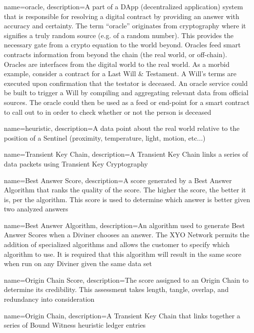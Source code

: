 \documentclass{article}
\begin{document}
{
    name={oracle},
    description={A part of a DApp (decentralized application) system that is responsible for resolving a digital contract by providing an answer with accuracy and certainty. The term ``oracle'' originates from cryptography where it signifies a truly random source (e.g. of a random number). This provides the necessary gate from a crypto equation to the world beyond. Oracles feed smart contracts information from beyond the chain (the real world, or off-chain). Oracles are interfaces from the digital world to the real world. As a morbid example, consider a contract for a Last Will \& Testament. A Will's terms are executed upon confirmation that the testator is deceased. An oracle service could be built to trigger a Will by compiling and aggregating relevant data from official sources. The oracle could then be used as a feed or end-point for a smart contract to call out to in order to check whether or not the person is deceased}
}

{
    name={heuristic},
    description={A data point about the real world relative to the position of a Sentinel (proximity, temperature, light, motion, etc...)}
}

{
    name={Transient Key Chain},
    description={A Transient Key Chain links a series of data packets using Transient Key Cryptography}
}

{
    name={Best Answer Score},
    description={A score generated by a Best Answer Algorithm that ranks the quality of the score.  The higher the score, the better it is, per the algorithm.  This score is used to determine which answer is better given two analyzed answers}
}

{
    name={Best Answer Algorithm},
    description={An algorithm used to generate Best Answer Scores when a Diviner chooses an answer.  The XYO Network permits the addition of specialized algorithms and allows the customer to specify which algorithm to use.  It is required that this algorithm will result in the same score when run on any Diviner given the same data set}
}

{
    name={Origin Chain Score},
    description={The score assigned to an Origin Chain to determine its credibility. This assessment takes length, tangle, overlap, and redundancy into consideration}
}

{
    name={Origin Chain},
    description={A Transient Key Chain that links together a series of Bound Witness heuristic ledger entries}
}
\end{document}
